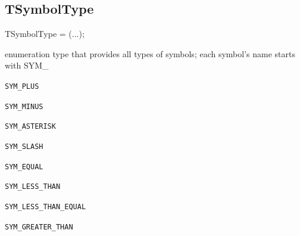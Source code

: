 \documentclass{report}
\newif\ifpdf
\begin{document}
\subsection*{TSymbolType}
\fi
\label{PasDoc_Tokenizer-TSymbolType}
\begin{list}{}{
\setlength{\itemindent}{0cm}
\setlength{\listparindent}{0cm}
\setlength{\leftmargin}{\evensidemargin}
\addtolength{\leftmargin}{\tmplength}
\settowidth{\labelsep}{X}
\addtolength{\leftmargin}{\labelsep}
\setlength{\labelwidth}{\tmplength}
}
\item[\textbf{Declaration}\hfill]
\ifpdf
\begin{flushleft}
\fi
\begin{ttfamily}
TSymbolType = (...);\end{ttfamily}

\ifpdf
\end{flushleft}
\fi

\par
\item[\textbf{Description}]
enumeration type that provides all types of symbols; each symbol's name starts with SYM{\_}\item[\textbf{Values}]
\begin{description}
\item[\texttt{SYM{\_}PLUS}] \label{PasDoc_Tokenizer-SYM_PLUS}
\index{}
 
\item[\texttt{SYM{\_}MINUS}] \label{PasDoc_Tokenizer-SYM_MINUS}
\index{}
 
\item[\texttt{SYM{\_}ASTERISK}] \label{PasDoc_Tokenizer-SYM_ASTERISK}
\index{}
 
\item[\texttt{SYM{\_}SLASH}] \label{PasDoc_Tokenizer-SYM_SLASH}
\index{}
 
\item[\texttt{SYM{\_}EQUAL}] \label{PasDoc_Tokenizer-SYM_EQUAL}
\index{}
 
\item[\texttt{SYM{\_}LESS{\_}THAN}] \label{PasDoc_Tokenizer-SYM_LESS_THAN}
\index{}
 
\item[\texttt{SYM{\_}LESS{\_}THAN{\_}EQUAL}] \label{PasDoc_Tokenizer-SYM_LESS_THAN_EQUAL}
\index{}
 
\item[\texttt{SYM{\_}GREATER{\_}THAN}] \label{PasDoc_Tokenizer-SYM_GREATER_THAN}
\index{}
 

\end{description}
\end{list}
\end{document}
